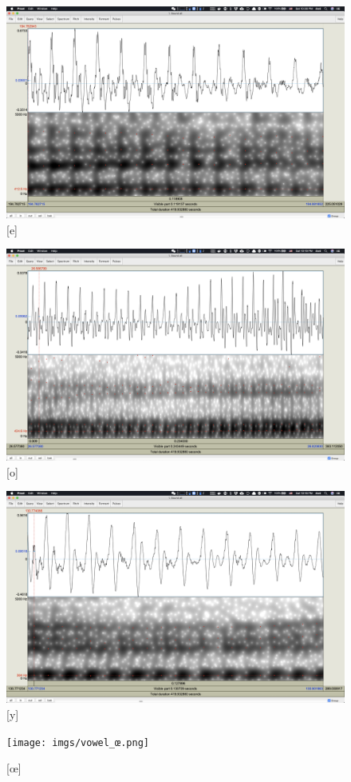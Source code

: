 \documentclass[a4paper]{article}
\begin{document}
\begin{figure}[H]
    \centering
    \includegraphics[scale=0.25]{imgs/vowel_e.png}
    \caption{[e]}
\end{figure}
\begin{figure}[H]
    \centering
    \includegraphics[scale=0.25]{imgs/vowel_o.png}
    \caption{[o]}
\end{figure}
\begin{figure}[H]
    \centering
    \includegraphics[scale=0.25]{imgs/vowel_y.png}
    \caption{[y]}
\end{figure}
\begin{figure}[H]
    \centering
    \texttt{[image: imgs/vowel\_œ.png]}
    \caption{[œ]}
\end{figure}
\end{document}
